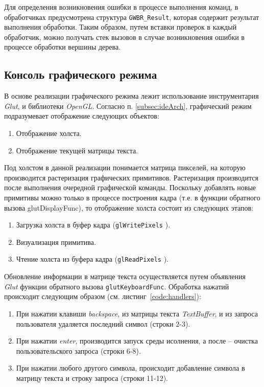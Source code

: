 \documentclass[12pt]{article}
\begin{document}
			\indent Для определения возникновения ошибки в процессе выполнения команд, в обработчиках предусмотрена структура {\tt GWBR\_Result}, которая содержит результат выполнения обработки. Таким образом, путем вставки проверок в каждый обработчик, можно получать стек вызовов в случае возникновения ошибки в процессе обработки вершины дерева. 
		\subsection{Консоль графического режима}
			\hspace{\parindent} В основе реализации графического режима лежит использование инструментария {\it Glut}, и библиотеки {\it OpenGL}. Согласно п. \ref{subsec:ideArch}, графический режим подразумевает отображение следующих объектов:
			\begin{enumerate}
				\item Отображение холста.
				\item Отображение текущей матрицы текста.
			\end{enumerate}
			
			\indent Под холстом в данной реализации понимается матрица пикселей, на которую производится растеризация графических примитивов. Растеризация производится после выполнения очередной графической команды. Поскольку добавлять новые примитивы можно только в процессе построения кадра (т.е. в функции обратного вызова glutDisplayFunc), то отображение холста состоит из следующих этапов:
			\begin{enumerate}
				\item Загрузка холста в буфер кадра ({\tt glWritePixels} \cite{glManual}).
				\item Визуализация примитива.
				\item Чтение холста из буфера кадра ({\tt glReadPixels} \cite{glManual}).
			\end{enumerate} 

			\indent Обновление информации в матрице текста осуществляется путем объявления {\it Glut} функции обратного вызова {\tt glutKeyboardFunc}. Обработка нажатий происходит следующим образом (см. листинг~\ref{code:handlers}):
			\begin{enumerate}
				\item При нажатии клавиши {\it backspace}, из матрицы текста {\it TextBuffer}, и из запроса пользователя удаляется последний символ (строки 2-3).
				\item При нажатии {\it enter}, производится запуск среды исолнения, а после -- очистка пользовательского запроса (строки 6-8).
				\item При нажатии любого другого символа, происходит добавление символа в матрицу текста и строку запроса (строки 11-12).
			\end{enumerate}
			
				
\end{document}
